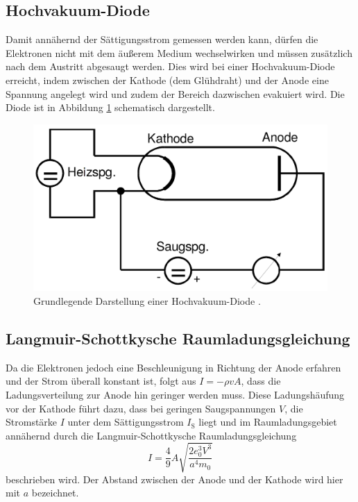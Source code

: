 \subsection{Hochvakuum-Diode}
Damit annähernd der Sättigungsstrom gemessen werden kann, dürfen die Elektronen nicht mit dem äußerem Medium wechselwirken und müssen zusätzlich nach dem Austritt abgesaugt werden. Dies wird bei einer Hochvakuum-Diode erreicht, indem zwischen der Kathode (dem Glühdraht) und der Anode eine Spannung angelegt wird und zudem der Bereich dazwischen evakuiert wird. Die Diode ist in Abbildung \ref{fig:Hochvakuum-Diode} schematisch dargestellt.
\begin{figure}
	\centering
	\includegraphics[width=\linewidth-150pt,height=\textheight-150pt,keepaspectratio]{content/Bilder/Hochvakuum-Diode.png}
	\caption{Grundlegende Darstellung einer Hochvakuum-Diode \cite{V504}.}
	\label{fig:Hochvakuum-Diode}
\end{figure}

\subsection{Langmuir-Schottkysche Raumladungsgleichung}
Da die Elektronen jedoch eine Beschleunigung in Richtung der Anode erfahren und der Strom überall konstant ist, folgt aus $I = -\rho v A $, dass die Ladungsverteilung zur Anode hin geringer werden muss. Diese Ladungshäufung vor der Kathode führt dazu, dass bei geringen Saugspannungen $V$, die Stromstärke $I$ unter dem Sättigungsstrom $I_\text{S}$ liegt und im Raumladungsgebiet annähernd durch die Langmuir-Schottkysche Raumladungsgleichung 
\begin{equation}
	I = \frac{4}{9} A \sqrt{\frac{2 e_0^3 V^3}{a^4 m_0} } \label{eq:Langmuir-Schottkysche_Raumladungsgleichung}
\end{equation} 
beschrieben wird. Der Abstand zwischen der Anode und der Kathode wird hier mit $a$ bezeichnet.

